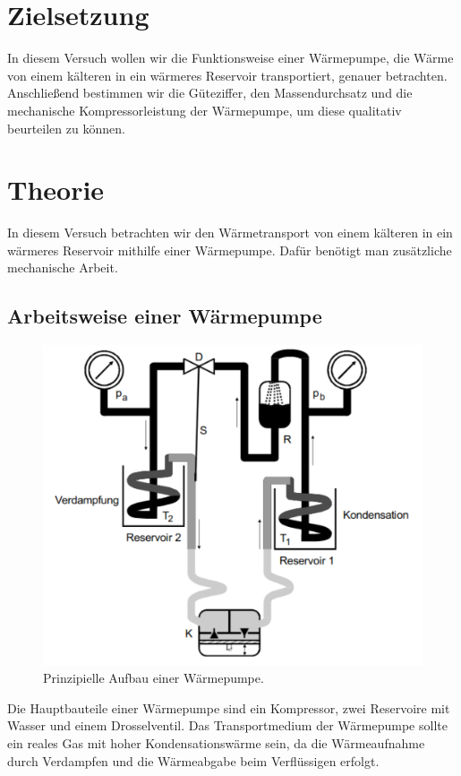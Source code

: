 \section{Zielsetzung}
\label{sec:Zielsetzung}
In diesem Versuch wollen wir die Funktionsweise einer Wärmepumpe, die Wärme von einem kälteren in ein wärmeres Reservoir transportiert, genauer betrachten.
Anschließend bestimmen wir die Güteziffer, den Massendurchsatz und die mechanische Kompressorleistung der Wärmepumpe, um diese qualitativ beurteilen zu können.  
\section{Theorie}
\label{sec:Theorie}
In diesem Versuch betrachten wir den Wärmetransport von einem kälteren in ein wärmeres Reservoir mithilfe einer Wärmepumpe.
Dafür benötigt man zusätzliche mechanische Arbeit.

\subsection{Arbeitsweise einer Wärmepumpe}
\begin{figure}
    \centering
    \includegraphics[width=\textwidth]{Aufbau_Waermepumpe.pdf}
    \caption{Prinzipielle Aufbau einer Wärmepumpe.\cite[3]{anleitung}}    
\end{figure}
Die Hauptbauteile einer Wärmepumpe sind ein Kompressor, zwei Reservoire mit Wasser und einem Drosselventil.
Das Transportmedium der Wärmepumpe sollte ein reales Gas mit hoher Kondensationswärme sein, da die Wärmeaufnahme  durch Verdampfen und die Wärmeabgabe beim Verflüssigen erfolgt.

